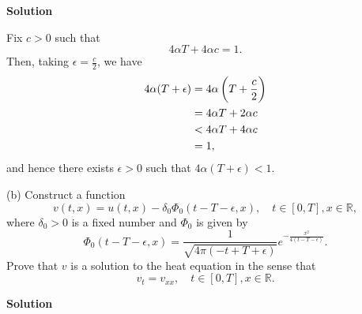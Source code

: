 \documentclass{article}
\begin{document}
\textbf{Solution}

Fix $c > 0$ such that
%
\begin{equation*}
    4 \alpha T + 4 \alpha c = 1
    .
\end{equation*}
%
Then, taking $\epsilon = \frac{c}{2}$, we have
%
\begin{align*}
    4 \alpha (T + \epsilon)
        &= 4 \alpha \del{T + \frac{c}{2}} \\
        &= 4 \alpha T + 2 \alpha c \\
        &< 4 \alpha T + 4 \alpha c \\
        &= 1
    ,
\end{align*}
%
and hence there exists $\epsilon > 0$ such that
$4 \alpha (T + \epsilon) < 1$.

\vspace{5mm}

(b) Construct a function
%
\begin{equation*}
    v(t, x) = u(t, x) - \delta_0 \Phi_0(t - T - \epsilon, x),
    \quad t \in [0, T], x \in \mathbb{R}
    ,
\end{equation*}
%
where $\delta_0 > 0$ is a fixed number and $\Phi_0$ is given by
%
\begin{equation*}
    \Phi_0(t - T - \epsilon, x)
        = \frac{1}{\sqrt{4 \pi (- t + T + \epsilon)}}
            e^{- \frac{x^2}{4 (t - T - \epsilon)}}
        .
\end{equation*}
%
Prove that $v$ is a solution to the heat equation in the sense that
%
\begin{equation*}
    v_t = v_{xx},
    \quad t \in [0, T], x \in \mathbb{R}
    .
\end{equation*}

\textbf{Solution}
\end{document}
